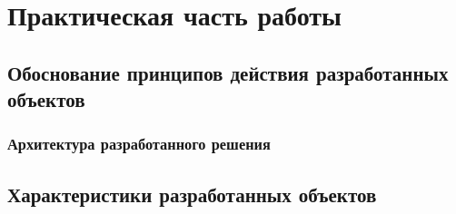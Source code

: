 \chapter{Практическая часть работы}
\section{Обоснование принципов действия разработанных объектов}
\subsection{Архитектура разработанного решения}
\section{Характеристики разработанных объектов}
